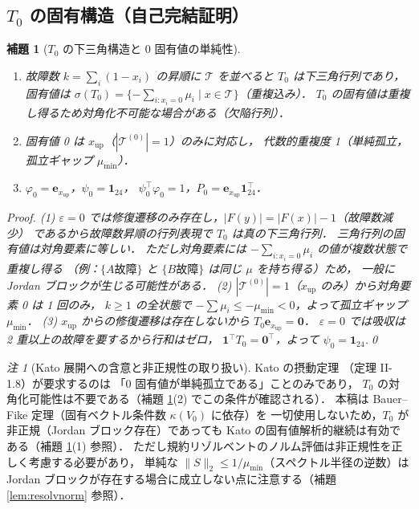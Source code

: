 \documentclass[12pt,a4paper]{article}
\theoremstyle{plain}
\newtheorem{lemma}[theorem]{補題}
\theoremstyle{definition}
\theoremstyle{remark}
\newtheorem{remark}[theorem]{注}
\newcommand{\calT}{\mathcal{T}}
\newcommand{\eps}{\varepsilon}
\newcommand{\RedRes}{S}
\newcommand{\Proj}{P}
\begin{document}
\subsection{$T_0$ の固有構造（自己完結証明）}

\begin{lemma}[$T_0$ の下三角構造と 0 固有値の単純性]\label{lem:T0spec}
  \begin{enumerate}[label=(\arabic*)]
    \item 故障数 $k=\sum_i(1-x_i)$ の昇順に $\calT$ を並べると
          $T_0$ は下三角行列であり，
          固有値は
          $\sigma(T_0)=\{-\sum_{i:x_i=0}\mu_i \mid x\in\calT\}$（重複込み）．
          $T_0$ の固有値は重複し得るため対角化不可能な場合がある（欠陥行列）．

    \item 固有値 0 は $x_{\mathrm{up}}$（$|\calT^{(0)}|=1$）のみに対応し，
          代数的重複度 1（単純孤立，孤立ギャップ $\mu_{\min}$）．

    \item $\varphi_0 = \mathbf{e}_{x_{\mathrm{up}}}$，$\psi_0 = \mathbf{1}_{24}$，
          $\psi_0^\top\varphi_0=1$，$\Proj_0 = \mathbf{e}_{x_{\mathrm{up}}}\mathbf{1}_{24}^\top$．
  \end{enumerate}

  \begin{proof}
    (1) $\eps=0$ では修復遷移のみ存在し，$|F(y)|=|F(x)|-1$（故障数減少）
    であるから故障数昇順の行列表現で $T_0$ は真の下三角行列．
    三角行列の固有値は対角要素に等しい．
    ただし対角要素には $-\sum_{i:x_i=0}\mu_i$ の値が複数状態で重複し得る
    （例：$\{A\text{故障}\}$ と $\{B\text{故障}\}$ は同じ $\mu$ を持ち得る）ため，
    一般に Jordan ブロックが生じる可能性がある．
    (2) $|\calT^{(0)}|=1$（$x_{\mathrm{up}}$ のみ）から対角要素 0 は 1 回のみ，
    $k\ge1$ の全状態で $-\sum\mu_i \le -\mu_{\min}<0$，よって孤立ギャップ $\mu_{\min}$．
    (3) $x_{\mathrm{up}}$ からの修復遷移は存在しないから $T_0\mathbf{e}_{x_{\mathrm{up}}}=\mathbf{0}$．
    $\eps=0$ では吸収は 2 重以上の故障を要するから行和はゼロ，
    $\mathbf{1}^\top T_0=\mathbf{0}^\top$，よって $\psi_0=\mathbf{1}_{24}$.\qed
  \end{proof}
\end{lemma}

\begin{remark}[Kato 展開への含意と非正規性の取り扱い]
  Kato の摂動定理 \cite{kato1995}（定理 II-1.8）が要求するのは
  「0 固有値が単純孤立である」ことのみであり，
  $T_0$ の対角化可能性は不要である（補題 \ref{lem:T0spec}(2) でこの条件が確認される）．
  本稿は Bauer--Fike 定理（固有ベクトル条件数 $\kappa(V_0)$ に依存）を
  一切使用しないため，$T_0$ が非正規（Jordan ブロック存在）であっても
  Kato の固有値解析的継続は有効である（補題 \ref{lem:T0spec}(1) 参照）．
  ただし規約リゾルベントのノルム評価は非正規性を正しく考慮する必要があり，
  単純な $\|\RedRes\|_2 \le 1/\mu_{\min}$（スペクトル半径の逆数）は
  Jordan ブロックが存在する場合に成立しない点に注意する（補題 \ref{lem:resolvnorm} 参照）．
\end{remark}
\end{document}

